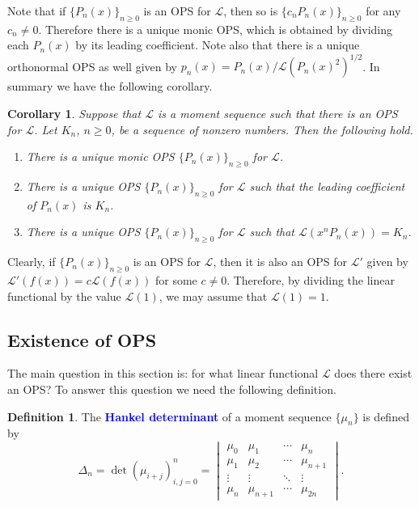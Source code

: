 \documentclass{amsart}
\numberwithin{equation}{section}
\newtheorem{cor}[thm]{Corollary}
\theoremstyle{definition}
\newtheorem{defn}[thm]{Definition}
\newcommand\LL{\mathcal{L}}
\renewcommand\emph[1]{\textcolor{blue}{\bf #1}}
\begin{document}
Note that if \( \{ P_n(x) \}_{n\ge 0} \) is an OPS for \( \LL \), then
so is \( \{ c_nP_n(x) \}_{n\ge 0} \) for any \( c_n\ne 0 \). Therefore
there is a unique monic OPS, which is obtained by dividing each
\( P_n(x) \) by its leading coefficient. Note also that there is a
unique orthonormal OPS as well given by
\( p_n(x) = P_n(x)/\LL(P_n(x)^2)^{1/2} \). In summary we have the following
corollary.

\begin{cor}\label{cor:OPS-unique}
  Suppose that \( \LL \) is a moment sequence such that there is an
  OPS for \( \LL \). Let \( K_n \), \( n\ge0 \), be a sequence of
  nonzero numbers. Then the following hold.
  \begin{enumerate}
  \item There is a unique monic OPS \( \{ P_n(x) \}_{n\ge 0} \) for \( \LL \).
  \item There is a unique OPS \( \{ P_n(x) \}_{n\ge 0} \) for \( \LL \)
    such that the leading coefficient of \( P_n(x) \) is \( K_n \).
  \item There is a unique OPS \( \{ P_n(x) \}_{n\ge 0} \) for \( \LL \)
    such that \( \LL(x^nP_n(x)) = K_n \).
  \end{enumerate}
\end{cor}


Clearly, if \( \{ P_n(x) \}_{n\ge 0} \) is an OPS for \( \LL \), then
it is also an OPS for \( \LL' \) given by
\( \LL'(f(x)) = c \LL(f(x)) \) for some \( c\ne 0 \). Therefore, by
dividing the linear functional by the value \( \LL(1) \), we may
assume that \( \LL(1)=1 \).


\subsection{Existence of OPS}

The main question in this section is: for what linear functional
\( \LL \) does there exist an OPS? To answer this question we need the
following definition.

\begin{defn}
  The \emph{Hankel determinant} of a moment sequence \( \{\mu_n\} \)
  is defined by
  \[
    \Delta_n = \det(\mu_{i+j})_{i,j=0}^n
    = \begin{vmatrix}
        \mu_0 & \mu_1 & \cdots & \mu_n\\
        \mu_1 & \mu_2 & \cdots & \mu_{n+1}\\
        \vdots & \vdots & \ddots & \vdots\\
        \mu_n & \mu_{n+1} & \cdots & \mu_{2n}
      \end{vmatrix} .
  \]
\end{defn}
\end{document}
